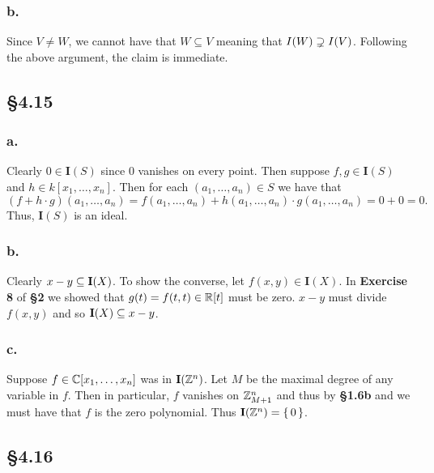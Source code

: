 \documentclass[letterpaper]{article}
\begin{document}
\subsubsection*{b.}

Since $V \neq W$, we cannot have that $W \subseteq V$ meaning that $I(W) \supsetneq I(V)$.
Following the above argument, the claim is immediate.

\subsection*{\S 4.15}

\subsubsection*{a.}

Clearly $0 \in \mathbf{I}(S)$ since $0$ vanishes on every point. Then suppose $f, g \in \mathbf{I}(S)$ and $h \in k[x_{1},\ldots, x_{n}]$. Then for each $(a_{1}, \ldots, a_{n}) \in S$ we have that
\[
  (f + h \cdot g)(a_{1}, \ldots, a_{n}) = f(a_{1}, \ldots, a_{n}) + h(a_{1}, \ldots, a_{n}) \cdot g(a_{1}, \ldots, a_{n}) = 0 + 0 = 0.
\]
Thus, $\mathbf{I}(S)$ is an ideal.

\subsubsection*{b.}

Clearly $\ideal{x - y} \subseteq \mathbf{I}(X)$.
To show the converse, let $f(x, y) \in \mathbf{I}(X)$.
In \textbf{Exercise 8} of \textbf{\S 2} we showed that $g(t) = f(t, t) \in \mathbb{R}[t]$ must be zero.
 $x - y$ must divide $f(x, y)$ and so $\mathbf{I}(X) \subseteq \ideal{x - y}$.

\subsubsection*{c.}

Suppose $f \in \mathbb{C}[x_{1}, \ldots, x_{n}]$ was in $\mathbf{I}\pqty{\Z^{n}}$. Let $M$ be the maximal degree of any variable in $f$. Then in particular, $f$ vanishes on $\mathbb{Z}_{M + 1}^{n}$ and thus by \textbf{\S 1.6b} and we must have that $f$ is the zero polynomial. Thus $\mathbf{I}\pqty{\Z^{n}} = \set{0}$.

\subsection*{\S 4.16}
\end{document}
